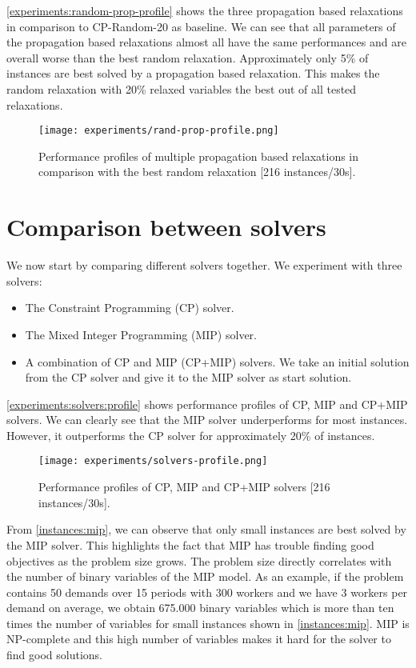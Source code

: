\documentclass[../../thesis.tex]{subfiles}
\begin{document}
\autoref{experiments:random-prop-profile} shows the three propagation based relaxations in comparison to CP-Random-20 as baseline.
We can see that all parameters of the propagation based relaxations almost all have the same performances and 
are overall worse than the best random relaxation. Approximately only 5\% of instances are best solved by a propagation based 
relaxation. This makes the random relaxation with 20\% relaxed variables the best out of all tested relaxations.

\begin{figure}
  \centering
  \texttt{[image: experiments/rand-prop-profile.png]}
  \caption{Performance profiles of multiple propagation based relaxations in comparison with the best random relaxation [216 instances/30s].}
  \label{experiments:random-prop-profile}
\end{figure}


\section{Comparison between solvers}

We now start by comparing different solvers together. We experiment with three solvers: 

\begin{itemize}
  \item The Constraint Programming (CP) solver.
  \item The Mixed Integer Programming (MIP) solver.
  \item A combination of CP and MIP (CP+MIP) solvers. We take an initial solution from the CP solver 
  and give it to the MIP solver as start solution. 
\end{itemize}



\autoref{experiments:solvers:profile} 
shows performance profiles of CP, MIP and CP+MIP solvers. We can clearly see that 
the MIP solver underperforms for most instances. However, it outperforms the CP solver for approximately
20\% of instances. 

\begin{figure}
  \centering
  \texttt{[image: experiments/solvers-profile.png]}
  \caption{Performance profiles of CP, MIP and CP+MIP solvers [216 instances/30s].}
  \label{experiments:solvers:profile}
\end{figure}

From \autoref{instances:mip}, we can observe that only small instances are best solved by the MIP solver. 
This highlights the fact that MIP has trouble finding good objectives as the problem size grows.
The problem size directly correlates with the number of binary variables of the MIP model. As an example,
if the problem contains 50 demands over 15 periods with 300 workers and we have 3 workers per demand on average,
we obtain 675.000 binary variables which is more than ten times the number of variables for small instances shown 
in \autoref{instances:mip}. MIP is NP-complete and this high number of variables makes it hard for the solver to find good solutions.
\end{document}
